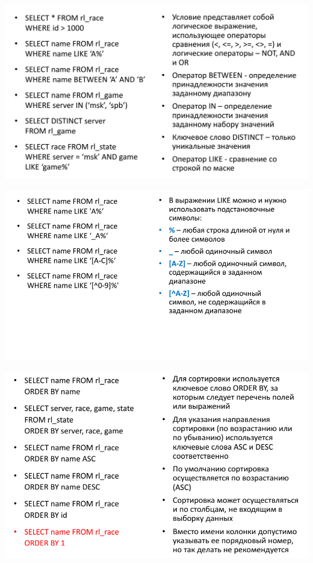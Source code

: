 \documentclass{beamer}
\begin{document}
\begin{frame}
	\begin{center}
		\includegraphics[scale=0.4]{images/sql-02.png}
	\end{center}
\end{frame} 

\begin{frame}
	\begin{center}
		\includegraphics[scale=0.5]{images/sql-03.png}
	\end{center}
\end{frame} 

\begin{frame}
	\begin{center}
		\includegraphics[scale=0.5]{images/sql-04.png}
	\end{center}
\end{frame} 
\end{document}
